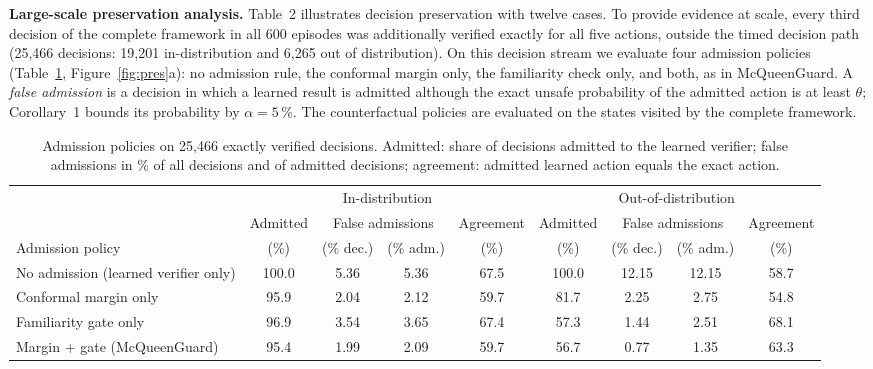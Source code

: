 \documentclass[11pt]{article}
\begin{document}
\textbf{Large-scale preservation analysis.} Table~2 illustrates decision preservation with twelve cases. To provide evidence at scale, every
third decision of the complete framework in all 600 episodes was additionally verified exactly for all five actions, outside the timed
decision path (25,466 decisions: 19,201 in-distribution and 6,265 out of
distribution). On this decision stream we evaluate four admission policies (Table~\ref{tab:pol}, Figure~\ref{fig:pres}a): no admission rule, the
conformal margin only, the familiarity check only, and both, as in McQueenGuard. A \emph{false admission} is a decision in which a learned result
is admitted although the exact unsafe probability of the admitted action is at least $\theta$; Corollary~1 bounds its probability by $\alpha=5\,\%$.
The counterfactual policies are evaluated on the states visited by the complete framework.

\begin{table}[h]
\centering\small
\caption{Admission policies on 25,466 exactly verified decisions. Admitted: share of decisions admitted to the learned verifier;
false admissions in \% of all decisions and of admitted decisions; agreement: admitted learned action equals the exact action.}\label{tab:pol}
\begin{adjustbox}{max width=\linewidth}
\begin{tabular}{lcccccccc}
\toprule
 & \multicolumn{4}{c}{In-distribution} & \multicolumn{4}{c}{Out-of-distribution} \\
\cmidrule(lr){2-5}\cmidrule(lr){6-9}
 & Admitted & \multicolumn{2}{c}{False admissions} & Agreement & Admitted & \multicolumn{2}{c}{False admissions} & Agreement \\
Admission policy & (\%) & (\% dec.) & (\% adm.) & (\%) & (\%) & (\% dec.) & (\% adm.) & (\%) \\
\midrule
No admission (learned verifier only) & 100.0 & 5.36 & 5.36 & 67.5 & 100.0 & 12.15 & 12.15 & 58.7 \\
Conformal margin only & 95.9 & 2.04 & 2.12 & 59.7 & 81.7 & 2.25 & 2.75 & 54.8 \\
Familiarity gate only & 96.9 & 3.54 & 3.65 & 67.4 & 57.3 & 1.44 & 2.51 & 68.1 \\
Margin + gate (McQueenGuard) & 95.4 & 1.99 & 2.09 & 59.7 & 56.7 & 0.77 & 1.35 & 63.3 \\
\bottomrule
\end{tabular}
\end{adjustbox}
\end{table}
\end{document}
